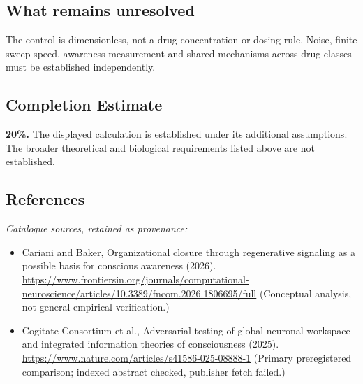 \documentclass[11pt]{article}
\begin{document}
\subsection{What remains unresolved}
The control is dimensionless, not a drug concentration or dosing rule. Noise, finite sweep speed, awareness measurement and shared mechanisms across drug classes must be established independently.
\subsection{Completion Estimate}
\textbf{20\%.} The displayed calculation is established under its additional assumptions. The broader theoretical and biological requirements listed above are not established.
\subsection{References}
\noindent\emph{Catalogue sources, retained as provenance:}
\begin{itemize}
\item Cariani and Baker, Organizational closure through regenerative signaling as a possible basis for conscious awareness (2026). \url{https://www.frontiersin.org/journals/computational-neuroscience/articles/10.3389/fncom.2026.1806695/full} (Conceptual analysis, not general empirical verification.)
\item Cogitate Consortium et al., Adversarial testing of global neuronal workspace and integrated information theories of consciousness (2025). \url{https://www.nature.com/articles/s41586-025-08888-1} (Primary preregistered comparison; indexed abstract checked, publisher fetch failed.)
\end{itemize}
\clearpage


\appendix
\end{document}
